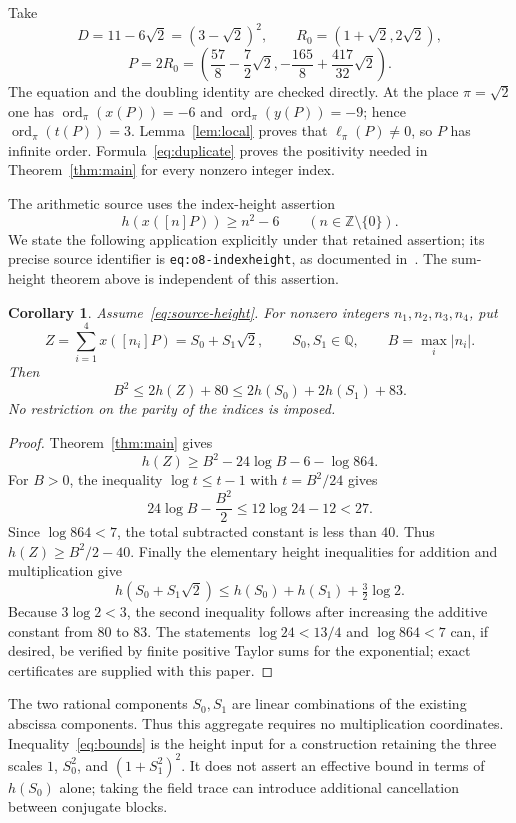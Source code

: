 \documentclass[11pt,a4paper]{article}
\newtheorem{corollary}[theorem]{Corollary}
\newcommand{\Q}{\mathbb Q}\newcommand{\Z}{\mathbb Z}
\newcommand{\ord}{\operatorname{ord}}
\begin{document}
Take
\[
 D=11-6\sqrt2=(3-\sqrt2)^2,
 \qquad R_0=(1+\sqrt2,2\sqrt2),
\]
\[
 P=2R_0=
 \left(\frac{57}8-\frac72\sqrt2,
       -\frac{165}8+\frac{417}{32}\sqrt2\right).
\]
The equation and the doubling identity are checked directly.
At the place $\pi=\sqrt2$ one has
$\ord_\pi(x(P))=-6$ and $\ord_\pi(y(P))=-9$; hence
$\ord_\pi(t(P))=3$.
Lemma~\ref{lem:local} proves that $\ell_\pi(P)\ne0$, so
$P$ has infinite order. Formula~\eqref{eq:duplicate} proves
the positivity needed in Theorem~\ref{thm:main} for every
nonzero integer index.

The arithmetic source uses the index-height assertion
\begin{equation}\label{eq:source-height}
                 h(x([n]P))\ge n^2-6\qquad(n\in\Z\setminus\{0\}).
\end{equation}
We state the following application explicitly under that
retained assertion; its precise source identifier is
\nolinkurl{eq:o8-indexheight}, as documented in~\cite{Arithmetic}.
The sum-height theorem above is independent of this assertion.

\begin{corollary}\label{cor:numerical}
Assume~\eqref{eq:source-height}. For nonzero integers
$n_1,n_2,n_3,n_4$, put
\[
 Z=\sum_{i=1}^4x([n_i]P)=S_0+S_1\sqrt2,
 \qquad S_0,S_1\in\Q,
 \qquad B=\max_i|n_i|.
\]
Then
\begin{equation}\label{eq:bounds}
 B^2\le2h(Z)+80
       \le2h(S_0)+2h(S_1)+83.
\end{equation}
No restriction on the parity of the indices is imposed.
\end{corollary}
\begin{proof}
Theorem~\ref{thm:main} gives
\[
 h(Z)\ge B^2-24\log B-6-\log864.
\]
For $B>0$, the inequality $\log t\le t-1$ with
$t=B^2/24$ gives
\[
 24\log B-\frac{B^2}2
 \le12\log24-12<27.
\]
Since $\log864<7$, the total subtracted constant is
less than $40$. Thus $h(Z)\ge B^2/2-40$.
Finally the elementary height inequalities for addition and
multiplication give
\[
 h(S_0+S_1\sqrt2)
 \le h(S_0)+h(S_1)+\tfrac32\log2.
\]
Because $3\log2<3$, the second inequality follows after
increasing the additive constant from $80$ to $83$.
The statements $\log24<13/4$ and $\log864<7$ can, if
desired, be verified by finite positive Taylor sums for the
exponential; exact certificates are supplied with this paper.
\end{proof}

The two rational components $S_0,S_1$ are linear combinations
of the existing abscissa components. Thus this aggregate
requires no multiplication coordinates. Inequality~\eqref{eq:bounds}
is the height input for a construction retaining the three
scales $1$, $S_0^2$, and $(1+S_1^2)^2$.
It does not assert an effective bound in terms of $h(S_0)$
alone; taking the field trace can introduce additional
cancellation between conjugate blocks.
\end{document}
